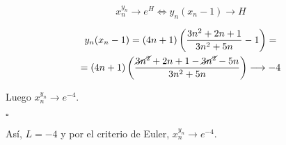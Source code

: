 \documentclass[12pt]{article}
\begin{document}
\begin{ejercicio}[2 puntos]
        \[
        x_n ^{y_n} \longrightarrow e^H \Longleftrightarrow y_n(x_n-1) \longrightarrow H
        \]

        \begin{gather*}
            y_n(x_n-1)= (4n+1) \left( \dfrac{3n^2 + 2n +1}{3n^2 + 5n} -1 \right) =\\
            = (4n+1) \left( \dfrac{\cancel{3n^2} + 2n +1 -\cancel{3n^2} - 5n}{3n^2 + 5n}\right) \longrightarrow -4
        \end{gather*}

        Luego $x_n ^{y_n} \longrightarrow e^{-4}$.\\
        \begin{flushright}
            $\square$
        \end{flushright} 

        Así, $L=-4$ y por el criterio de Euler, $x_n ^{y_n} \longrightarrow e^{-4}$.
    \end{ejercicio}


     
\end{document}
